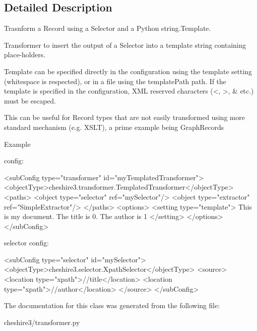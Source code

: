 \subsection{Detailed Description}
\begin{DoxyVerb}Trasnform a Record using a Selector and a Python string.Template.

Transformer to insert the output of a Selector into a template string
containing place-holders.

Template can be specified directly in the configuration using the 
template setting (whitespace is respected), or in a file using the 
templatePath path. If the template is specified in the configuration, 
XML reserved characters (<, >, & etc.) must be escaped.

This can be useful for Record types that are not easily transformed using
more standard mechanism (e.g. XSLT), a prime example being GraphRecords

Example

config:

<subConfig type="transformer" id="myTemplatedTransformer">
    <objectType>cheshire3.transformer.TemplatedTransformer</objectType>
    <paths>
        <object type="selector" ref="mySelector"/>
        <object type="extractor" ref="SimpleExtractor"/>
    </paths>
    <options>
        <setting type="template">
            This is my document. The title is {0}. The author is {1}
        </setting>
    </options>
</subConfig>

selector config:

<subConfig type="selector" id="mySelector">
    <objectType>cheshire3.selector.XpathSelector</objectType>
    <source>
        <location type="xpath">//title</location>
        <location type="xpath">//author</location>
    </source>
</subConfig>\end{DoxyVerb}
 

The documentation for this class was generated from the following file\-:\begin{DoxyCompactItemize}
\item 
cheshire3/transformer.\-py\end{DoxyCompactItemize}
